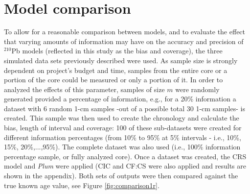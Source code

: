 \documentclass [10pt] {article}
\begin{document}

\section{Model comparison}

To allow for a reasonable comparison between models, and to evaluate the effect that varying amounts of information may have on the accuracy and precision of $^{210}$Pb models (reflected in this study as the bias and coverage), the three simulated data sets previously described were used. 
As sample size is strongly dependent on project's budget and time, samples from the entire core or a portion of the core could be measured or only a portion of it.
In order to analyzed the effects of this parameter, samples of size $m$ were randomly generated provided a percentage of information, e.g., for a 20\% information a dataset with 6 random 1-cm samples -out of a possible total 30 1-cm samples- is created.
This sample was then used to create the chronology and calculate the bias, length of interval and coverage:
100 of these sub-datasets were created for different information percentages (from 10\% to 95\% at 5\% intervals - i.e., 10\%, 15\%, 20\%,...,95\%). 
The complete dataset was also used (i.e., 100\% information percentage sample, or fully analyzed core).
Once a dataset was created, the CRS model and \textit{Plum} were applied (CIC and CF:CS were also applied and results are shown in the appendix).  
Both sets of outputs were then compared against the true known age value, see Figure \ref{fig:comparison1r}.
\end{document}
